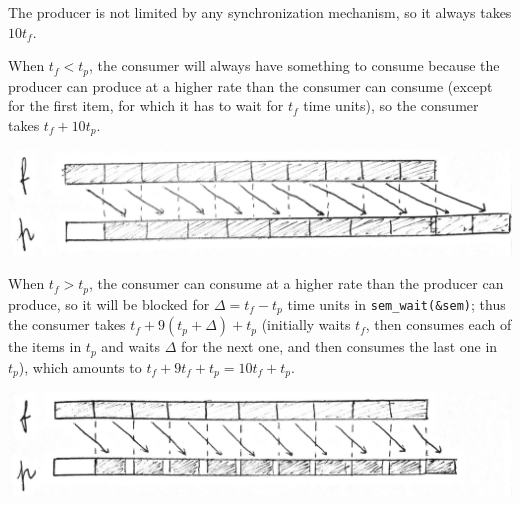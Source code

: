 \documentclass{sope}
\begin{document}
The producer is not limited by any synchronization mechanism, so it always takes $10t_f$.

When $t_f < t_p$, the consumer will always have something to consume because the producer can produce at a higher rate than the consumer can consume (except for the first item, for which it has to wait for $t_f$ time units), so the consumer takes $t_f + 10t_p$.

\begin{center}
    \includegraphics[scale=0.2]{2015N_06e-2}
\end{center}

When $t_f > t_p$, the consumer can consume at a higher rate than the producer can produce, so it will be blocked for $\Delta = t_f-t_p$ time units in \texttt{sem\_wait(\&sem)}; thus the consumer takes $t_f + 9(t_p+\Delta)+t_p$ (initially waits $t_f$, then consumes each of the items in $t_p$ and waits $\Delta$ for the next one, and then consumes the last one in $t_p$), which amounts to $t_f+9t_f + t_p = 10t_f + t_p$.

\begin{center}
    \includegraphics[scale=0.2]{2015N_06e-1}
\end{center}
\end{document}
